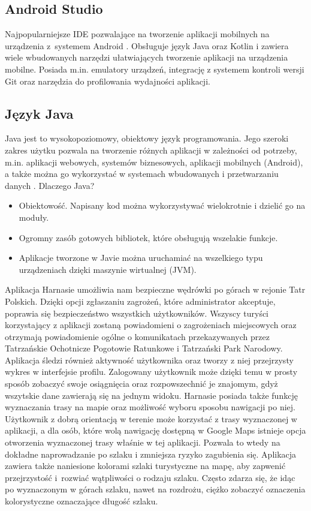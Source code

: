 \subsection*{Android Studio}
Najpopularniejsze IDE pozwalające na tworzenie aplikacji mobilnych na urządzenia z~systemem Android \cite{androidstudio} \cite{android-studio-book}. Obsługuje język Java oraz Kotlin i zawiera wiele wbudowanych narzędzi ułatwiających tworzenie aplikacji na urządzenia mobilne. Posiada m.in. emulatory urządzeń, integrację z systemem kontroli wersji Git oraz narzędzia do profilowania wydajności aplikacji.

\subsection*{Język Java}
Java \cite{java} jest to wysokopoziomowy, obiektowy język programowania. Jego szeroki zakres użytku pozwala na tworzenie różnych aplikacji w zależności od potrzeby, m.in. aplikacji webowych, systemów biznesowych, aplikacji mobilnych (Android), a także można go wykorzystać w systemach wbudowanych i przetwarzaniu danych \cite{java-book}.
Dlaczego Java?
\begin{itemize}
    \item Obiektowość. Napisany kod można wykorzystywać wielokrotnie i dzielić go na moduły.
    \item Ogromny zasób gotowych bibliotek, które obsługują wszelakie funkcje.
    \item Aplikacje tworzone w Javie można uruchamiać na wszelkiego typu urządzeniach dzięki maszynie wirtualnej (JVM).
\end{itemize}

Aplikacja Harnasie umożliwia nam bezpieczne wędrówki po górach w rejonie Tatr Polskich. Dzięki opcji zgłaszaniu zagrożeń, które administrator akceptuje, poprawia się bezpieczeństwo wszystkich użytkowników. Wszyscy turyści korzystający z aplikacji zostaną powiadomieni o zagrożeniach miejscowych oraz otrzymają powiadomienie ogólne o komunikatach przekazywanych przez Tatrzańskie Ochotnicze Pogotowie Ratunkowe i Tatrzański Park Narodowy. Aplikacja śledzi również aktywność użytkownika oraz tworzy z niej przejrzysty wykres w interfejsie profilu. Zalogowany użytkownik może dzięki temu w prosty sposób zobaczyć swoje osiągnięcia oraz rozpowszechnić je znajomym, gdyż wszytskie dane zawierają się na jednym widoku. Harnasie posiada także funkcję wyznaczania trasy na mapie oraz możliwość wyboru sposobu nawigacji po niej. Użytkownik z dobrą orientacją w terenie może korzystać z trasy wyznaczonej w aplikacji, a dla osób, które wolą nawigację dostępną w Google Maps istnieje opcja otworzenia wyznaczonej trasy właśnie w tej aplikacji. Pozwala to wtedy na dokładne naprowadzanie po szlaku i zmniejsza ryzyko zagubienia się. Aplikacja zawiera także naniesione kolorami szlaki turystyczne na mapę, aby zapwenić przejrzystość i~rozwiać wątpliwości o rodzaju szlaku. Często zdarza się, że idąc po wyznaczonym w górach szlaku, nawet na rozdrożu, ciężko zobaczyć oznaczenia kolorystyczne oznaczające długość szlaku. 


  